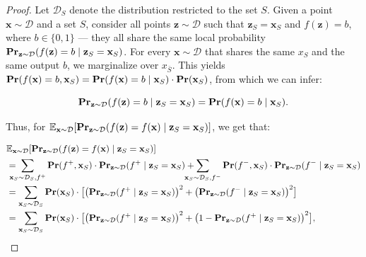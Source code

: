 \documentclass{article}
\newcommand{\z}{\textbf{z}}
\newcommand{\x}{\textbf{x}}
\newcommand{\fml}[1]{{\mathcal{#1}}}
\newcommand{\mbf}[1]{\ensuremath\mathbf{#1}}
\newcommand{\mbb}[1]{\ensuremath\mathbb{#1}}
\begin{document}
\begin{proof}
Let $\mathcal{D}_{S}$ denote the distribution restricted to the set $S$.
Given a point $\x \sim \mathcal{D}$ and a set $S$, consider all points $\z \sim \mathcal{D}$ such that $\z_{S} = \x_{S}$ and $f(\z) = b$, where $b \in \{0,1\}$ —
they all share the same local probability $\mbf{Pr}_{\z \sim \mathcal{D}}(f(\z) = b \mid \z_{S} = \x_{S})$.
%
For every $\x \sim \mathcal{D}$ that shares the same $x_{S}$ and the same output $b$, we marginalize over $x_{\bar{S}}$.
This yields $\mbf{Pr}(f(\x) = b, \x_{S}) = \mbf{Pr}(f(\x) = b \mid \x_{S}) \cdot \mbf{Pr}(\x_{S})$,
from which we can infer:



%


\begin{equation}
\mbf{Pr}_{\z\sim \mathcal{D}}(f(\z) = b \mid \z_{S} = \x_{S}) = \mbf{Pr}(f(\x) = b \mid \x_{S}).
\end{equation}


Thus, for $\mbb{E}_{\x\sim \mathcal{D}}[\mbf{Pr}_{\z\sim \mathcal{D}}(f(\z) = f(\x) \mid \z_{S} = \x_{S})]$, we get that:

\begin{equation} \label{eq:gbx01}
\begin{aligned}
&\mbb{E}_{\x\sim \mathcal{D}}[\mbf{Pr}_{\z\sim \mathcal{D}}(f(\z) = f(\x) \mid \z_{S} = \x_{S})] \\
&= \hspace*{-1em} \sum_{\x_{S}\sim \fml{D}_{S}, f^{+}} \mbf{Pr}(f^{+}, \x_{S}) \cdot \mbf{Pr}_{\z\sim \mathcal{D}}(f^{+} \mid \z_{S} = \x_{S}) + \hspace*{-1.3em}
\sum_{\x_{S}\sim \fml{D}_{S}, f^{-}} \mbf{Pr}(f^{-}, \x_{S}) \cdot \mbf{Pr}_{\z\sim \mathcal{D}}(f^{-} \mid \z_{S} = \x_{S}) \\
&= \sum_{\x_{S}\sim \fml{D}_{S}} \mbf{Pr}(\x_{S}) \cdot \bigl[\bigl(\mbf{Pr}_{\z\sim \mathcal{D}}(f^{+} \mid \z_{S} = \x_{S})\bigr)^2 + \bigl(\mbf{Pr}_{\z\sim \mathcal{D}}(f^{-} \mid \z_{S} = \x_{S})\bigr)^2\bigr] \\
&= \sum_{\x_{S}\sim \fml{D}_{S}} \mbf{Pr}(\x_{S}) \cdot \bigl[\bigl(\mbf{Pr}_{\z\sim \mathcal{D}}(f^{+} \mid \z_{S} = \x_{S})\bigr)^2 + \bigl(1 - \mbf{Pr}_{\z\sim \mathcal{D}}(f^{+} \mid \z_{S} = \x_{S})\bigr)^2\bigr],
\end{aligned}
\end{equation}



\end{proof}
\end{document}
